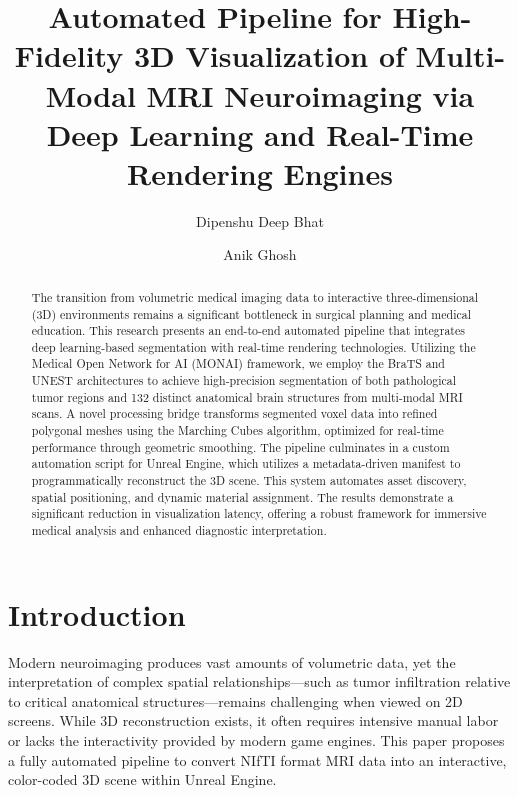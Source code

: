 \documentclass[runningheads]{llncs}
\begin{document}
%
\title{Automated Pipeline for High-Fidelity 3D Visualization of Multi-Modal MRI Neuroimaging via Deep Learning and Real-Time Rendering Engines}
%
%
\author{Dipenshu Deep Bhat \and
Anik Ghosh}
%
%
%
\maketitle              %
%
\begin{abstract}
The transition from volumetric medical imaging data to interactive three-dimensional (3D) environments remains a significant bottleneck in surgical planning and medical education. This research presents an end-to-end automated pipeline that integrates deep learning-based segmentation with real-time rendering technologies. Utilizing the Medical Open Network for AI (MONAI) framework, we employ the BraTS and UNEST architectures to achieve high-precision segmentation of both pathological tumor regions and 132 distinct anatomical brain structures from multi-modal MRI scans. A novel processing bridge transforms segmented voxel data into refined polygonal meshes using the Marching Cubes algorithm, optimized for real-time performance through geometric smoothing. The pipeline culminates in a custom automation script for Unreal Engine, which utilizes a metadata-driven manifest to programmatically reconstruct the 3D scene. This system automates asset discovery, spatial positioning, and dynamic material assignment. The results demonstrate a significant reduction in visualization latency, offering a robust framework for immersive medical analysis and enhanced diagnostic interpretation.

\end{abstract}
%
%
%
\section{Introduction}
Modern neuroimaging produces vast amounts of volumetric data, yet the interpretation of complex spatial relationships—such as tumor infiltration relative to critical anatomical structures—remains challenging when viewed on 2D screens. While 3D reconstruction exists, it often requires intensive manual labor or lacks the interactivity provided by modern game engines. This paper proposes a fully automated pipeline to convert NIfTI format MRI data into an interactive, color-coded 3D scene within Unreal Engine.
\end{document}
